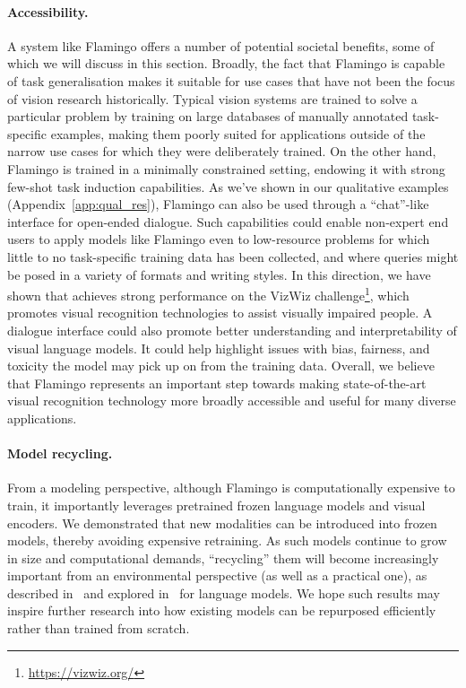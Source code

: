\paragraph{Accessibility.}
A system like Flamingo offers a number of potential societal benefits, some of which we will discuss in this section.
Broadly, the fact that Flamingo is capable of task generalisation makes it suitable for use cases that have not been the focus of vision research historically.
Typical vision systems are trained to solve a particular problem by training on large databases of manually annotated task-specific examples, making them poorly suited for applications outside of the narrow use cases for which they were deliberately trained.
On the other hand, Flamingo is trained in a minimally constrained setting, endowing it with strong few-shot task induction capabilities.
As we've shown in our qualitative examples (Appendix~\ref{app:qual_res}), Flamingo can also be used through a ``chat''-like interface for open-ended dialogue.
Such capabilities could enable non-expert end users to apply models like Flamingo even to low-resource problems for which little to no task-specific training data has been collected, and where queries might be posed in a variety of formats and writing styles.
In this direction, we have shown that \largem{} achieves strong performance on the VizWiz challenge\footnote{\url{https://vizwiz.org/}}, which promotes visual recognition technologies to assist visually impaired people.
A dialogue interface could also promote better understanding and interpretability of visual language models.
It could help highlight issues with bias, fairness, and toxicity the model may pick up on from the training data.
Overall, we believe that Flamingo represents an important step towards making state-of-the-art visual recognition technology more broadly accessible and useful for many diverse applications.

\paragraph{Model recycling.}
From a modeling perspective, although Flamingo is computationally expensive to train, it importantly leverages pretrained frozen language models and visual encoders. We demonstrated that new modalities can be introduced into frozen models, thereby avoiding expensive retraining.
As such models continue to grow in size and computational demands, ``recycling'' them will become increasingly important from an environmental perspective (as well as a practical one), as
described in~\citet{larochelle-recycling} and
explored in~\citet{energynlp} for language models.
We hope such results may inspire further research into how existing models can be repurposed efficiently rather than trained from scratch.

